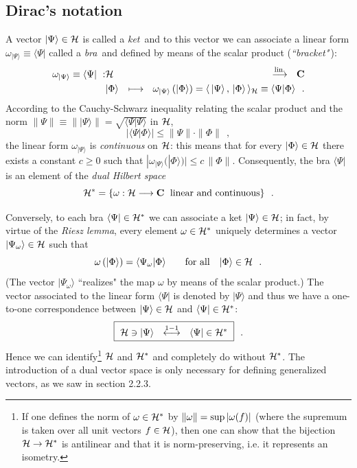 \documentclass[12pt]{report}
\begin{document}
\subsection{Dirac's notation}

A vector $|\Psi \rangle \in {\cal H}$ is called a {\em ket}$\,$
and to this vector we can associate a linear form 
$\omega_{|\Psi \rangle} \equiv \langle \Psi |$
called a {\em bra}$\,$ and defined by means of the scalar product
($\!${\em ``bracket"}$\,$):
\begin{eqnarray}
\label{bra}
\omega_{|\Psi \rangle} \equiv \langle \Psi |
\ : & {\cal H} & \stackrel{{\rm lin.}}{\longrightarrow} \ \ {\bf C}
\\
 & |\Phi \rangle & \longmapsto \ \
\omega_{|\Psi \rangle} \left( | \Phi \rangle \right)
= \langle \,
|\Psi \rangle \, , \,   | \Phi \rangle \, \rangle  _{{\cal H}} \equiv
\langle \Psi | \Phi \rangle
\ \ .
\nonumber
\end{eqnarray}
According to the Cauchy-Schwarz inequality relating 
the scalar product 
and the norm 
$\|  \Psi  \| \equiv \| |  \Psi  \rangle \| =
\sqrt{\langle \Psi | \Psi \rangle}$
in ${\cal H}$,
\[
| \langle \Psi | \Phi \rangle | \leq
\| \Psi \|   \cdot
\| \Phi  \|
\ \ ,
\]
the linear form 
$\omega_{|\Psi \rangle}$ is {\em continuous} on ${\cal H}$: 
this means that for every 
$|\Phi \rangle \in {\cal H}$ 
there exists a constant 
$c\geq 0$ 
such that 
$| \omega_{| \Psi \rangle} (| \Phi \rangle ) | \leq
c  \, \| \Phi \|$. 
Consequently, the bra 
$\langle \Psi |$ is an element of the {\em dual Hilbert space} 
\[
{\cal H}^{\ast} = \{ \omega : {\cal H}
\longrightarrow {\bf C} \ \; \mbox{linear and continuous} \}
\ \ .
\]
 
Conversely, to each bra $\langle \Psi | \in {\cal H}^{\ast}$
we can associate a ket $| \Psi \rangle \in {\cal H}$;
in fact, by virtue of the {\em Riesz lemma},
every element  $\omega \in {\cal H}^{\ast}$ 
uniquely determines a vector $| \Psi _{\omega} \rangle
\in {\cal H}$ such that 
\[
\omega \left( | \Phi \rangle \right)
= \langle \Psi_{\omega} | \Phi \rangle
\qquad \mbox{for all} \quad | \Phi \rangle \in {\cal H}
\ \ .
\]
(The vector 
$| \Psi _{\omega} \rangle$ ``realizes" the map $\omega$
by means of the scalar product.)  
The vector associated to the linear form $\langle \Psi |$
is denoted by $| \Psi \rangle$ and thus we have a 
one-to-one correspondence between $| \Psi \rangle \in {\cal H}$
and $\langle \Psi | \in {\cal H}^{\ast}$:
\begin{equation}
\fbox{\mbox{$ \ {\cal H} \ni
| \Psi \rangle \ \ \stackrel{{\rm 1-1}}{\longleftrightarrow}
\ \ \langle \Psi | \in {\cal H}^{\ast} \ $}}
\ \ .
\end{equation}
Hence we can identify\footnote{If one defines the norm of  
$\omega \in {\cal H}^{\ast}$ by $\| \omega \| =
{\rm sup} \, | \omega (f) |$ (where the supremum is taken 
 over all unit vectors $f \in {\cal H}$), then one can show that the 
bijection ${\cal H} \to {\cal H}^{\ast}$ is antilinear and that it is 
norm-preserving, i.e. it represents an isometry.} ${\cal H}$ and ${\cal H}^{\ast}$    
and completely do without ${\cal H}^{\ast}$. 
The introduction of a dual vector space is only necessary for defining 
generalized vectors, as we saw in section 2.2.3. 
\end{document}
